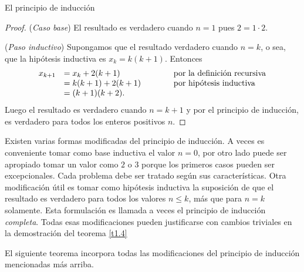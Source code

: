 \begin{section}{El principio de inducción}
\begin{proof}
\noindent(\textit{Caso  base}) El resultado es verdadero cuando $n=1$ pues $ 2 = 1 \cdot 2$.

\noindent (\textit{Paso  inductivo})
 Supongamos que el resultado verdadero cuando $n=k$, o sea, que la hipótesis inductiva es $x_k = k(k+1)$. Entonces
$$
\begin{matrix} 
x_{k+1} &= x_k + 2(k+1) \hfill &\qquad &\text{por la definición recursiva} \hfill \\
&= k(k+1)+2(k+1) \hfill &\qquad &\text{por hipótesis inductiva}\hfill \\
&= (k+1)(k+2). \hfill &
\end{matrix}
$$
Luego el resultado es verdadero cuando $n=k+1$ y por el principio de inducción, es verdadero para todos los enteros positivos $n$.
\end{proof}


Existen varias formas modificadas del principio de inducción. A veces es conveniente tomar como base inductiva el valor $n=0$, por otro lado puede ser apropiado tomar un valor como $2$ o $3$ porque los primeros casos pueden ser excepcionales. Cada problema debe ser tratado según sus características. Otra modificación útil es tomar como hipótesis inductiva la suposición de que el resultado es verdadero para todos los valores $n\le k$, más que para $n=k$ solamente. Esta formulación es llamada a veces el principio de inducción \textit{completa}. Todas esas modificaciones pueden justificarse con cambios triviales en la demostración del teorema \ref{t1.4}

El siguiente teorema incorpora todas las modificaciones del principio de inducción mencionadas más arriba.


\end{section}
